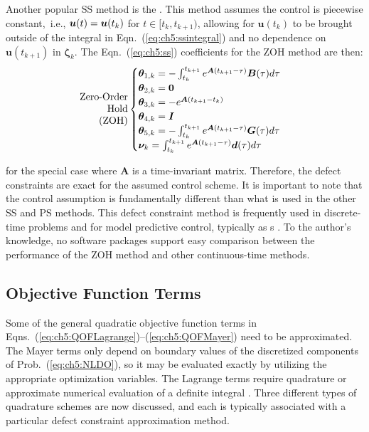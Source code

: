 Another popular SS method is the  \cite{Borrelli2015a}.
This method assumes the control is piecewise constant,~i.e., $\bm{u}(t) = \bm{u}(t_{k})$ for $t \in [t_k,t_{k+1})$, allowing for $\bm{u}(t_{k})$ to be brought outside of the integral in Eqn.~(\ref{eq:ch5:ssintegral}) and no dependence on $\bm{u}(t_{k+1})$ in $\bm{\zeta}_k$.
The Eqn.~(\ref{eq:ch5:ss}) coefficients for the ZOH method are then:
\begin{align}
\parbox{6em}{\begin{flushright}Zero-Order Hold \\ (ZOH)\end{flushright}} &\begin{cases}
\bm{\theta}_{1,k} = -\int_{t_k}^{t_{k+1}} e^{ \bm{A}(t_{k+1}-\tau) } \bm{B}(\tau) d\tau  \\
\bm{\theta}_{2,k} = \bm{0} \\
\bm{\theta}_{3,k} = -e^{ \bm{A}(t_{k+1}-t_k) } \\
\bm{\theta}_{4,k} = \bm{I}  \\
\bm{\theta}_{5,k} = -\int_{t_k}^{t_{k+1}} e^{ \bm{A}(t_{k+1}-\tau) } \bm{G}(\tau) d\tau \\
\bm{\nu}_k = \int_{t_k}^{t_{k+1}} e^{ \bm{A}(t_{k+1}-\tau) } \bm{d}(\tau) d\tau 
\end{cases} \label{eq:ch5:ssdefectsZOH}
\end{align}

\noindent for the special case where $\bm{A}$ is a time-invariant matrix.
Therefore, the defect constraints are exact for the assumed control scheme.
It is important to note that the control assumption is fundamentally different than what is used in the other SS and PS methods.
This defect constraint method is frequently used in discrete-time problems and for model predictive control, typically as {\qp}s \cite{Borrelli2015a, Hals2011a, Han2012a}.
To the author's knowledge, no software packages support easy comparison between the performance of the ZOH method and other continuous-time methods.

\subsection{Objective Function Terms} \label{sec:ch5:dt:objective}

Some of the general quadratic objective function terms in Eqns.~(\ref{eq:ch5:QOFLagrange})--(\ref{eq:ch5:QOFMayer}) need to be approximated.
The Mayer terms only depend on boundary values of the discretized components of Prob.~(\ref{eq:ch5:NLDO}), so it may be evaluated exactly by utilizing the appropriate optimization variables.
The Lagrange terms require quadrature or approximate numerical evaluation of a definite integral \cite{Heath2002a}.
Three different types of quadrature schemes are now discussed, and each is typically associated with a particular defect constraint approximation method.

